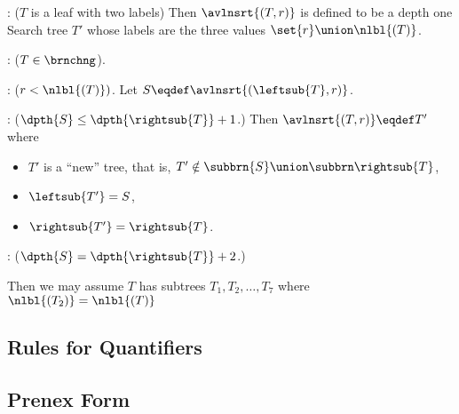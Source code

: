 \begin{definition}
\begin{definition}
: ($T$ is a leaf with two labels)
Then $\avlnsrt{(T,r)}$ is defined to be a depth one Search tree $T'$
whose labels are the three values $\set{r} \union \nlbl{(T)}$.

: ($T \in \brnchng$).  

\iffalse Let $L \eqdef \leftsub{(T)}, R \eqdef \rightsub{(T)}, d_L
\eqdef \dpth{L}, d_R \eqdef \dpth{R}.$ \fi

: ($r < \nlbl{(T)})$.  Let $S \eqdef
\avlnsrt{(\leftsub{T}, r)}$.

: ($\dpth{S} \leq \dpth{\rightsub{T}}+1$.)
Then $\avlnsrt{(T,r)} \eqdef T'$ where
\begin{itemize}

\item $T'$ is a ``new'' tree, that is, $T' \notin \subbrn{S} \union
  \subbrn \rightsub{T}$,

\item $\leftsub{T'} = S$,

\item $\rightsub{T'} = \rightsub{T}$.

\end{itemize}

: ($\dpth{S} = \dpth{\rightsub{T}}+2$.)

Then we may assume $T$ has subtrees $T_1,T_2,\dots,T_7$ where
$\nlbl{(T_2)} = \nlbl{(T)}$


\end{definition}

\begin{problems}
\practiceproblems
{}

\classproblems
{}

\homeworkproblems
{}

\examproblems
{}
\end{problems}

\begin{editingnotes}

\section{Rules for Quantifiers}

\subsection{Prenex Form}
\begin{problems}
\end{problems}
\end{editingnotes}


\end{definition}
